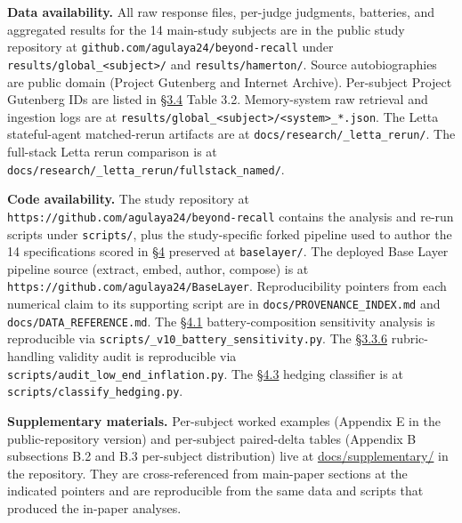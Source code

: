 \textbf{Data availability.} All raw response files, per-judge judgments,
batteries, and aggregated results for the 14 main-study subjects are in
the public study repository at
\texttt{github.com/agulaya24/beyond-recall} under
\texttt{results/global\_\textless{}subject\textgreater{}/} and
\texttt{results/hamerton/}. Source autobiographies are public domain
(Project Gutenberg and Internet Archive). Per-subject Project Gutenberg
IDs are listed in \hyperref[subjects]{§3.4} Table 3.2. Memory-system raw retrieval and
ingestion logs are at
\texttt{results/global\_\textless{}subject\textgreater{}/\textless{}system\textgreater{}\_*.json}.
The Letta stateful-agent matched-rerun artifacts are at
\texttt{docs/research/\_letta\_rerun/}. The full-stack Letta rerun
comparison is at
\texttt{docs/research/\_letta\_rerun/fullstack\_named/}.

\textbf{Code availability.} The study repository at
\texttt{https://github.com/agulaya24/beyond-recall} contains the
analysis and re-run scripts under \texttt{scripts/}, plus the
study-specific forked pipeline used to author the 14 specifications
scored in \hyperref[results]{§4} preserved at \texttt{baselayer/}. The
deployed Base Layer pipeline source (extract, embed, author, compose)
is at \texttt{https://github.com/agulaya24/BaseLayer}.
Reproducibility pointers from each numerical claim to
its supporting script are in \texttt{docs/PROVENANCE\_INDEX.md} and
\texttt{docs/DATA\_REFERENCE.md}. The \hyperref[the-cross-subject-gradient-and-its-per-question-mechanism]{§4.1} battery-composition
sensitivity analysis is reproducible via
\texttt{scripts/\_v10\_battery\_sensitivity.py}. The \hyperref[rubric-handling-limitations-post-hoc-validity-audit]{§3.3.6}
rubric-handling validity audit is reproducible via
\texttt{scripts/audit\_low\_end\_inflation.py}. The \hyperref[mechanism-correct-content-not-format]{§4.3} hedging
classifier is at \texttt{scripts/classify\_hedging.py}.

\textbf{Supplementary materials.} Per-subject worked examples (Appendix
E in the public-repository version) and per-subject paired-delta tables
(Appendix B subsections B.2 and B.3 per-subject distribution) live at
\href{https://github.com/agulaya24/beyond-recall/tree/main/docs/supplementary}{docs/supplementary/}
in the repository. They are cross-referenced from main-paper sections at
the indicated pointers and are reproducible from the same data and
scripts that produced the in-paper analyses.

